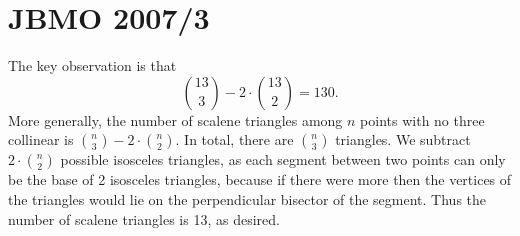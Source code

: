 \documentclass[11pt]{scrartcl}
\begin{document}
\section{JBMO 2007/3}
The key observation is that \[\binom{13}{3} - 2 \cdot \binom {13}{2} = 130.\] More generally, the number of scalene triangles among $n$ points with no three collinear is $\binom{n}{3} - 2\cdot \binom{n}{2}$. In total, there are $\binom{n}{3}$ triangles. We subtract $2\cdot \binom{n}{2}$ possible isosceles triangles, as each segment between two points can only be the base of 2 isosceles triangles, because if there were more then the vertices of the triangles would lie on the perpendicular bisector of the segment. Thus the number of scalene triangles is 13, as desired. 
\end{document}
